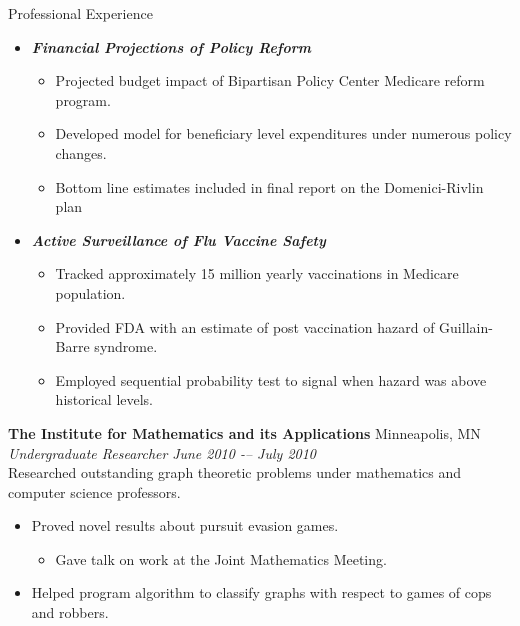 \documentclass{resume} %
\begin{document}
\begin{rSection}{Professional Experience}
\begin{itemize}
\begin{itemize}
        \newpage

    	\item {\bf \em Financial Projections of Policy Reform}
        \begin{itemize} \itemsep -0.2em
    		\item Projected budget impact of Bipartisan Policy Center Medicare reform program.
            \item Developed model for beneficiary level expenditures under numerous policy changes.
            \item Bottom line estimates included in final report on the Domenici-Rivlin plan
    	\end{itemize}
        \item {\bf \em Active Surveillance of Flu Vaccine Safety}
        \begin{itemize} \itemsep -0.2em
        	\item Tracked approximately 15 million yearly vaccinations in Medicare population.
        	\item Provided FDA with an estimate of post vaccination hazard of Guillain-Barre syndrome.
            \item Employed sequential probability test to signal when hazard was above historical levels.
        \end{itemize}
    \end{itemize}
\end{itemize}

\vspace{0.4em}


{\bf The Institute for Mathematics and its Applications} \hfill Minneapolis, MN \\
{\em Undergraduate Researcher} \hfill {\em June 2010 -– July 2010} \vspace{0.3em} \\
Researched outstanding graph theoretic problems under mathematics and computer science professors. 
\begin{itemize} \itemsep -0.2em
	\item Proved novel results about pursuit evasion games.
	\begin{itemize} \itemsep -0.2em
		\item Gave talk on work at the Joint Mathematics Meeting.
	\end{itemize}
	\item Helped program algorithm to classify graphs with respect to games of cops and robbers.
\end{itemize}
\end{rSection}
\end{document}
